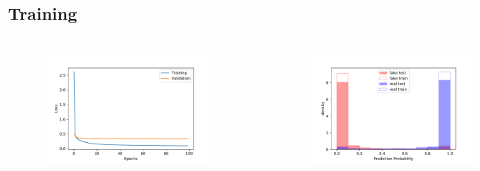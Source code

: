 \documentclass[aspectratio=1610, professionalfonts, 9pt]{beamer}
\begin{document}
\begin{frame}
\begin{columns}
\begin{figure}
          \caption{}
          \label{}
      \end{figure}
      
    \end{columns}
  \end{frame}

  \begin{frame}
    \frametitle{Training}
    \begin{columns}
      \begin{figure}
          \includegraphics[width=\textwidth]{pictures/bow/history_bow_best.pdf}
          \caption{}
          \label{}
      \end{figure}
      
      \begin{figure}
          \includegraphics[width=\textwidth]{pictures/bow/prob_bow_best_nn.pdf}
          \caption{}
          \label{}
      \end{figure}
      
    \end{columns}
  \end{frame}
\end{document}
